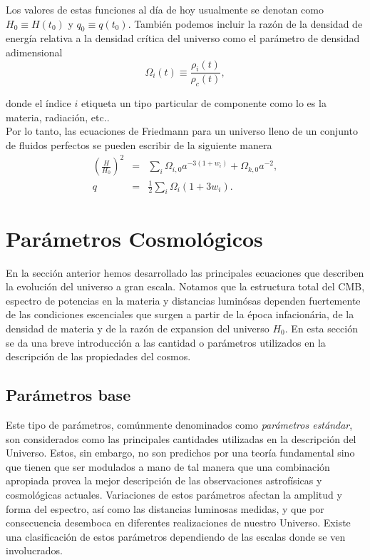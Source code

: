 \documentclass[10.5pt,prb,
               showpacs,            %
               preprintnumbers,     %
               aps,                 %
               prl,          	    %
               letterpaper,             %
               superscriptaddress,      %
               nofootinbib,         %
               tightenlines,        %
               floats,floatfix      %
               ,usenatbib]{revtex4-1}%
\def\beq{\begin{equation}}
\def\eeq{\end{equation}}
\begin{document}
Los valores de estas funciones al d\'ia de hoy usualmente se denotan como $H_0\equiv H(t_0)$
y $q_0 \equiv q(t_0)$.
Tambi\'en podemos incluir la raz\'on de la densidad de energ\'ia relativa a la densidad cr\'itica del universo
como el par\'ametro de densidad adimensional
%
	\beq
		\Omega_i(t) \equiv \frac{\rho_i(t)}{\rho_c(t)},
	\eeq

\noindent
donde el \'indice $i$ etiqueta un tipo particular de componente como lo es la materia, radiaci\'on, etc.. 
\\
Por lo tanto,  las ecuaciones de Friedmann para un universo
lleno de un conjunto de fluidos perfectos se pueden escribir de la siguiente manera
%
	\begin{eqnarray}
		\left(\frac{H}{H_0} \right)^2 &=& \sum_i \Omega_{i,0}a^{-3(1+w_i)} + \Omega_{k,0}a^{-2},\\
		q &=& \frac{1}{2} \sum_i \Omega_i (1+3w_i).
	\end{eqnarray}



\section{Par\'ametros Cosmol\'ogicos}


En la secci\'on anterior hemos desarrollado las principales ecuaciones que describen la evoluci\'on del
universo a gran escala. Notamos que la estructura total del CMB, espectro de potencias en la materia
y distancias lumin\'osas dependen fuertemente de las condiciones escenciales que surgen a partir de la \'epoca
infacion\'aria, de la densidad de materia y de la raz\'on de expansion del universo $H_0$. 
En esta secci\'on se da una breve introducci\'on a las cantidad o par\'ametros utilizados en la descripci\'on de las propiedades
del cosmos.


\subsection{Par\'ametros base}


Este tipo de par\'ametros, com\'unmente  denominados como \textit{par\'ametros est\'andar}, son considerados
como las principales cantidades utilizadas en la descripci\'on del Universo.
Estos, sin embargo, no son predichos por una teor\'ia fundamental sino que tienen que ser modulados
a mano de tal manera que una combinaci\'on apropiada provea la mejor descripci\'on de las observaciones
astrof\'isicas y cosmol\'ogicas  actuales. Variaciones de estos par\'ametros afectan la amplitud y forma del espectro, as\'i como
las distancias luminosas medidas, y que por consecuencia desemboca en diferentes realizaciones de nuestro 
Universo. Existe una clasificaci\'on de estos par\'ametros dependiendo de las escalas donde se ven involucrados.
\end{document}
